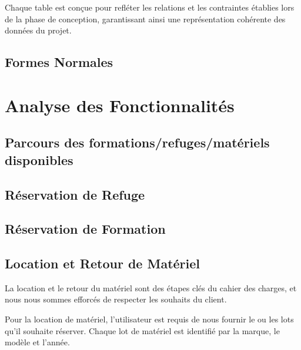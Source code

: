 Chaque table est conçue pour refléter les relations et les contraintes établies lors de la phase de conception, garantissant ainsi une représentation cohérente des données du projet.

\subsection{Formes Normales}

\section{Analyse des Fonctionnalités}

\subsection{Parcours des formations/refuges/matériels disponibles}
\subsection{Réservation de Refuge}
\subsection{Réservation de Formation}


\subsection{Location et Retour de Matériel}
La location et le retour du matériel sont des étapes clés du cahier des charges, et nous nous sommes efforcés de respecter les souhaits du client.

Pour la location de matériel, l'utilisateur est requis de nous fournir le ou les lots qu'il souhaite réserver. Chaque lot de matériel est identifié par la marque, le modèle et l'année.




